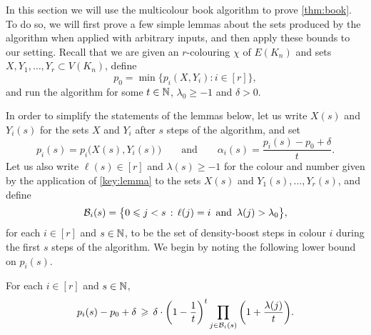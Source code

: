 In this section we will use the multicolour book algorithm to prove \autoref{thm:book}. To do so, we will first prove a few simple lemmas about the sets produced by the algorithm when applied with arbitrary inputs, and then apply these bounds to our setting. Recall that we are given an \(r\)-colouring \(\chi\) of \(E(K_n)\) and
sets \(X,Y_1,\ldots,Y_r \subset V(K_n)\), define
%
\begin{equation}
	\label{def:p0}
	p_0 = \min\big\{ p_i(X,Y_i) : i \in [r] \big\},
\end{equation}
%
and run the algorithm for some \(t \in \mathbb{N}\), \(\lambda_0 \ge -1\) and \(\delta > 0\).

In order to simplify the statements of the lemmas below, let us write \(X(s)\) and \(Y_i(s)\) for the sets \(X\) and \(Y_i\) after \(s\) steps of the algorithm, and set
%
\begin{equation*}
	p_i(s) = p_i\big( X(s), Y_i(s) \big) \qquad \text{and} \qquad \alpha_i(s) = \frac{p_i(s) - p_0 + \delta}{t}.
\end{equation*}
%
Let us also write \(\ell(s) \in [r]\) and \(\lambda(s) \ge -1\) for the colour and number given by the application of \autoref{key:lemma} to the sets \(X(s)\) and \(Y_1(s),\dots,Y_r(s)\), and define
%
\begin{equation*}
	\mathcal{B}_i(s) = \big\{ 0 \leqslant j < s \,:\, \ell(j) = i \, \text{ and } \, \lambda(j) > \lambda_0 \big\},
\end{equation*}
%
for each \(i \in [r]\) and \(s \in \mathbb{N}\), to be the set of density-boost steps in colour \(i\) during the first \(s\) steps of the algorithm. We begin by noting the following lower bound on \(p_i(s)\).


\begin{lemma}
  \label{lem:pi:lower:bound} %
  For each \(i \in [r]\) and \(s \in \mathbb{N}\), 
  \begin{equation}\label{eq:pi:lower:bound}
    p_i(s) - p_0 + \delta \, \geqslant \, \delta \cdot \bigg( 1 - \frac{1}{t} \bigg)^{t} \prod_{j \in \mathcal{B}_i(s)} \bigg( 1 + \frac{\lambda(j)}{t} \bigg).
  \end{equation}
\end{lemma}

